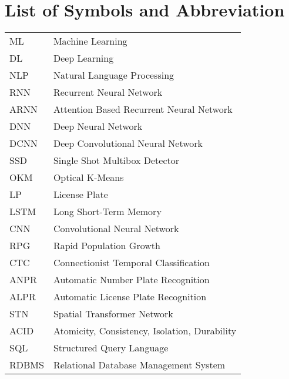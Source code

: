 
	    \tableofcontents

		\listoftables
		\break
		\pagebreak

		\listoffigures
		\break
	
	
	
		\Large
			\begingroup
				\let\clearpage\relax
				\chapter*{List of Symbols and Abbreviation}
			\endgroup
		\justify
		\normalsize
		\begin{tabular}{p{1in}p{3in}}
		    ML & Machine Learning \\
		    DL & Deep Learning \\
			NLP & Natural Language Processing\\
			RNN & Recurrent Neural Network\\
			ARNN & Attention Based Recurrent Neural Network\\
            DNN & Deep Neural Network\\
            DCNN & Deep Convolutional Neural Network\\
            SSD & Single Shot Multibox Detector\\
            OKM & Optical K-Means\\
            LP & License Plate\\
            LSTM & Long Short-Term Memory\\
            CNN & Convolutional Neural Network\\
            RPG & Rapid Population Growth\\
            CTC & Connectionist Temporal Classification\\
            ANPR & Automatic Number Plate Recognition\\
            ALPR & Automatic License Plate Recognition\\
            STN & Spatial Transformer Network\\
            ACID & Atomicity, Consistency, Isolation, Durability\\
            SQL & Structured Query Language\\
            RDBMS & Relational Database Management System\\
		\end{tabular}
		\break
		\pagebreak
		